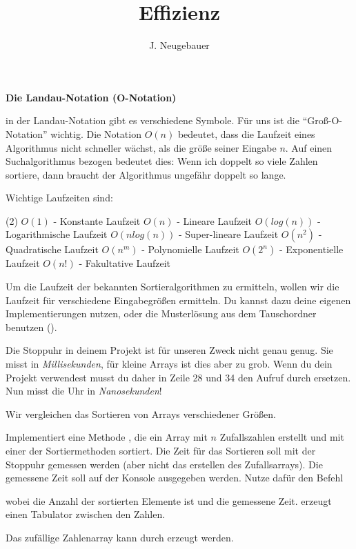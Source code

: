 \documentclass[10pt, a4paper]{scrartcl}
\author{J. Neugebauer}
\title{Effizienz}
\date{\Heute}
\begin{document}
\ReiheTitel

\begin{infobox}
	\textbf{Die Landau-Notation (O-Notation)}

	in der Landau-Notation gibt es verschiedene Symbole. Für uns ist die \enquote{Groß-O-Notation} wichtig. Die Notation $O(n)$ bedeutet, dass die Laufzeit eines Algorithmus nicht schneller wächst, als die größe seiner Eingabe $n$. Auf einen Suchalgorithmus bezogen bedeutet dies: Wenn ich doppelt so viele Zahlen sortiere, dann braucht der Algorithmus ungefähr doppelt so lange.

	\smallskip
	Wichtige Laufzeiten sind:
	\begin{tasks}[style=itemize](2)
		\task $O(1)$ - Konstante Laufzeit
		\task $O(n)$ - Lineare Laufzeit
		\task $O(log(n))$ - Logarithmische Laufzeit
		\task $O(nlog(n))$ - Super-lineare Laufzeit
		\task $O(n^2)$ - Quadratische Laufzeit
		\task $O(n^m)$ - Polynomielle Laufzeit
		\task $O(2^n)$ - Exponentielle Laufzeit
		\task $O(n!)$ - Fakultative Laufzeit
	\end{tasks}
\end{infobox}

Um die Laufzeit der bekannten Sortieralgorithmen zu ermitteln, wollen wir die Laufzeit für verschiedene Eingabegrößen ermitteln. Du kannst dazu deine eigenen Implementierungen nutzen, oder die Musterlösung aus dem Tauschordner benutzen ().

\begin{rahmen}{\Large\symGlocke}
Die Stoppuhr in deinem Projekt ist für unseren Zweck nicht genau genug. Sie misst in \emph{Millisekunden}, für kleine Arrays ist dies aber zu grob. Wenn du dein Projekt verwendest musst du daher in Zeile 28 und 34 den Aufruf  durch  ersetzen. Nun misst die Uhr in \emph{Nanosekunden}!
\end{rahmen}

Wir vergleichen das Sortieren von Arrays verschiedener Größen.

\begin{aufgabe}
	Implementiert eine Methode , die ein Array mit $n$ Zufallszahlen erstellt und mit einer der Sortiermethoden sortiert. Die Zeit für das Sortieren soll mit der Stoppuhr gemessen werden (aber nicht das erstellen des Zufallsarrays). Die gemessene Zeit soll auf der Konsole ausgegeben werden. Nutze dafür den Befehl


	wobei  die Anzahl der sortierten Elemente ist und  die gemessene Zeit.  erzeugt einen Tabulator zwischen den Zahlen.

	Das zufällige Zahlenarray kann durch  erzeugt werden.
\end{aufgabe}
\end{document}
